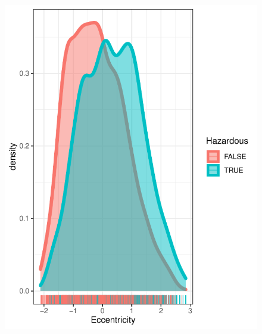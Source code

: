 \documentclass[12pt,%
               a4paper,%
               oneside,openany,%
               titlepage,%
               headinclude,footinclude,%
               BCOR5mm,%
               cleardoublepage=empty,%
               tablecaptionabove,%
               floatperchapter,
               ]{scrreprt}                 %
\begin{document}
\begin{figure}[ht]
\begin{minipage}[b]{0.5\linewidth}
    \includegraphics[width=.9\linewidth]{Figures/DENSITY_Eccentricity.pdf}
    \vspace{4ex}
  \end{minipage} \\
    \begin{minipage}[b]{0.5\linewidth}
    \centering

\end{minipage}
\end{figure}
\end{document}
